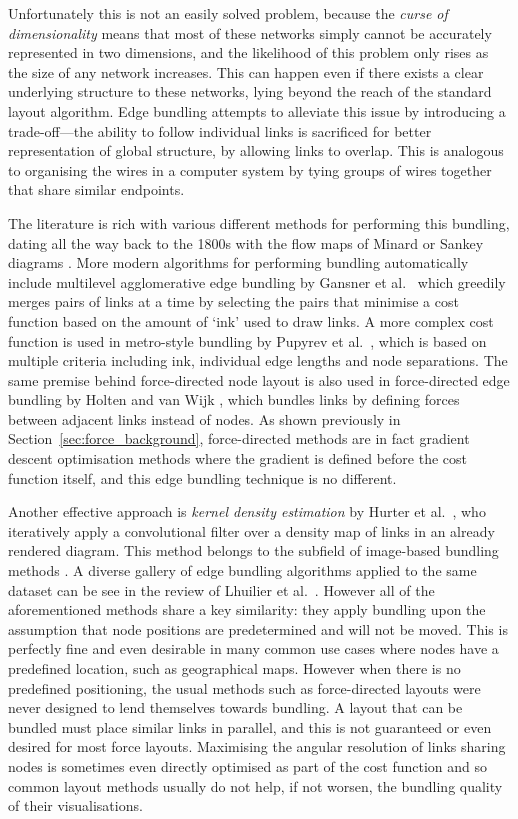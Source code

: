 Unfortunately this is not an easily solved problem, because the \textit{curse of dimensionality} \cite{Friedman2001} means that most of these networks simply cannot be accurately represented in two dimensions, and the likelihood of this problem only rises as the size of any network increases. This can happen even if there exists a clear underlying structure to these networks, lying beyond the reach of the standard layout algorithm.
Edge bundling attempts to alleviate this issue by introducing a trade-off---the ability to follow individual links is sacrificed for better representation of global structure, by allowing links to overlap.
This is analogous to organising the wires in a computer system by tying groups of wires together that share similar endpoints.

The literature is rich with various different methods for performing this bundling, dating all the way back to the 1800s with the flow maps of Minard \cite{Minard1862} or Sankey diagrams \cite{Sankey1896}.
More modern algorithms for performing bundling automatically include multilevel agglomerative edge bundling by Gansner et al.\ \cite{Gansner2011} which greedily merges pairs of links at a time by selecting the pairs that minimise a cost function based on the amount of `ink' used to draw links. A more complex cost function is used in metro-style bundling by Pupyrev et al.\ \cite{Pupyrev2016}, which is based on multiple criteria including ink, individual edge lengths and node separations. 
The same premise behind force-directed node layout is also used in force-directed edge bundling by Holten and van Wijk \cite{Holten2009}, which bundles links by defining forces between adjacent links instead of nodes. As shown previously in Section~\ref{sec:force_background}, force-directed methods are in fact gradient descent optimisation methods where the gradient is defined before the cost function itself, and this edge bundling technique is no different.

Another effective approach is \emph{kernel density estimation} by Hurter et al.\ \cite{Hurter2012}, who iteratively apply a convolutional filter over a density map of links in an already rendered diagram. This method belongs to the subfield of image-based bundling methods \cite{Lhuillier2017,Telea2018}. A diverse gallery of edge bundling algorithms applied to the same dataset can be see in the review of Lhuilier et al.\ \cite[Fig.~4]{Lhuillier2017}.
However all of the aforementioned methods share a key similarity: they apply bundling upon the assumption that node positions are predetermined and will not be moved. This is perfectly fine and even desirable in many common use cases where nodes have a predefined location, such as geographical maps. However when there is no predefined positioning, the usual methods such as force-directed layouts were never designed to lend themselves towards bundling. A layout that can be bundled must place similar links in parallel, and this is not guaranteed or even desired for most force layouts. Maximising the angular resolution of links sharing nodes is sometimes even directly optimised as part of the cost function \cite{Argyriou2010} and so common layout methods usually do not help, if not worsen, the bundling quality of their visualisations.

